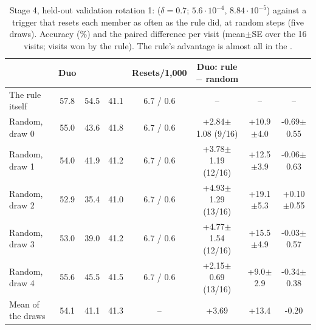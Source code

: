 \begin{table}[t]
  \centering\small\setlength{\tabcolsep}{4pt}
  \begin{tabular}{@{}lccccccc@{}}
    \toprule
    & Duo & \vit{} & \rn{} & Resets/1,000 & Duo: rule $-$ random & \vit{} & \rn{} \\
    \midrule
    The rule itself & 57.8 & 54.5 & 41.1 & 6.7 / 0.6 & -- & -- & -- \\
    \midrule
    Random, draw 0 & 55.0 & 43.6 & 41.8 & 6.7 / 0.6 & +2.84$\pm$1.08 (9/16) & +10.9$\pm$4.0 & -0.69$\pm$0.55 \\
    Random, draw 1 & 54.0 & 41.9 & 41.2 & 6.7 / 0.6 & +3.78$\pm$1.19 (12/16) & +12.5$\pm$3.9 & -0.06$\pm$0.63 \\
    Random, draw 2 & 52.9 & 35.4 & 41.0 & 6.7 / 0.6 & +4.93$\pm$1.29 (13/16) & +19.1$\pm$5.3 & +0.10$\pm$0.55 \\
    Random, draw 3 & 53.0 & 39.0 & 41.2 & 6.7 / 0.6 & +4.77$\pm$1.54 (12/16) & +15.5$\pm$4.9 & -0.03$\pm$0.57 \\
    Random, draw 4 & 55.6 & 45.5 & 41.5 & 6.7 / 0.6 & +2.15$\pm$0.69 (13/16) & +9.0$\pm$2.9 & -0.34$\pm$0.38 \\
    \midrule
    Mean of the draws & 54.1 & 41.1 & 41.3 & -- & +3.69 & +13.4 & -0.20 \\
    \bottomrule
  \end{tabular}
  \caption{Stage 4, held-out validation rotation 1:  ($\delta=0.7$; \vit{} $5.6{\cdot}10^{-4}$, \rn{} $8.84{\cdot}10^{-5}$) against a trigger that resets each member as often as the rule did, at random steps (five draws). Accuracy (\%) and the paired difference per visit (mean$\pm$SE over the 16 visits; visits won by the rule). The rule's advantage is almost all in the \vit{}.}
  \label{tab:tune_control}
\end{table}
